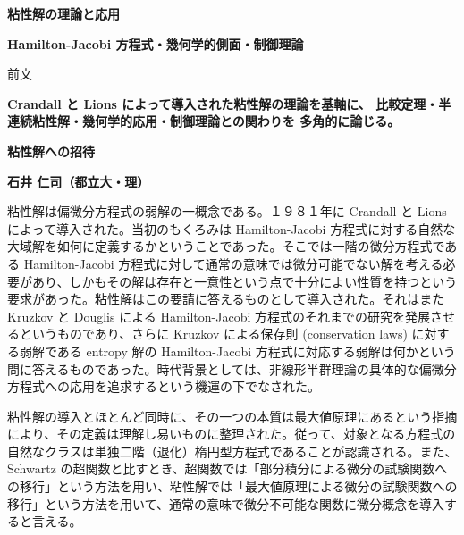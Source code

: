 \documentclass[uplatex,dvipdfmx]{jlreq}
\begin{document}
\begin{center}
  \vspace*{20pt}
  {\Huge\bfseries 粘性解の理論と応用}

  \vspace{30pt}

  {\Large\bfseries Hamilton-Jacobi 方程式・幾何学的側面・制御理論}

  \vspace{50pt}

  {\large 前文}

  \vspace{10pt}

  \parbox{0.85\textwidth}{
    \large\bfseries
    Crandall と Lions によって導入された粘性解の理論を基軸に、
    比較定理・半連続粘性解・幾何学的応用・制御理論との関わりを
    多角的に論じる。
  }
\end{center}

\vfill

\newpage

\begin{center}
{\large\bfseries 粘性解への招待}
\end{center}

\begin{flushright}
\textbf{石井 仁司（都立大・理）}
\end{flushright}

粘性解は偏微分方程式の弱解の一概念である。１９８１年に Crandall と Lions によって導入された。当初のもくろみは Hamilton-Jacobi 方程式に対する自然な大域解を如何に定義するかということであった。そこでは一階の微分方程式である Hamilton-Jacobi 方程式に対して通常の意味では微分可能でない解を考える必要があり、しかもその解は存在と一意性という点で十分によい性質を持つという要求があった。粘性解はこの要請に答えるものとして導入された。それはまた Kruzkov と Douglis による Hamilton-Jacobi 方程式のそれまでの研究を発展させるというものであり、さらに Kruzkov による保存則 (conservation laws) に対する弱解である entropy 解の Hamilton-Jacobi 方程式に対応する弱解は何かという問に答えるものであった。時代背景としては、非線形半群理論の具体的な偏微分方程式への応用を追求するという機運の下でなされた。

粘性解の導入とほとんど同時に、その一つの本質は最大値原理にあるという指摘により、その定義は理解し易いものに整理された。従って、対象となる方程式の自然なクラスは単独二階（退化）楕円型方程式であることが認識される。また、Schwartz の超関数と比すとき、超関数では「部分積分による微分の試験関数への移行」という方法を用い、粘性解では「最大値原理による微分の試験関数への移行」という方法を用いて、通常の意味で微分不可能な関数に微分概念を導入すると言える。
\end{document}
